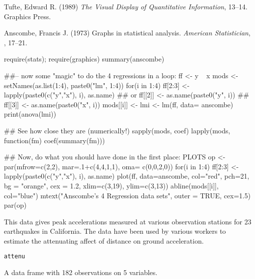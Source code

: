 %
\begin{Source}\relax
Tufte, Edward R. (1989)
\emph{The Visual Display of Quantitative Information}, 13--14.
Graphics Press.
\end{Source}
%
\begin{References}\relax
Anscombe, Francis J. (1973)  Graphs in statistical analysis.
\emph{American Statistician}, , 17--21.
\end{References}
%
\begin{Examples}
\begin{ExampleCode}
require(stats); require(graphics)
summary(anscombe)

##-- now some "magic" to do the 4 regressions in a loop:
ff <- y ~ x
mods <- setNames(as.list(1:4), paste0("lm", 1:4))
for(i in 1:4) {
  ff[2:3] <- lapply(paste0(c("y","x"), i), as.name)
  ## or   ff[[2]] <- as.name(paste0("y", i))
  ##      ff[[3]] <- as.name(paste0("x", i))
  mods[[i]] <- lmi <- lm(ff, data= anscombe)
  print(anova(lmi))
}

## See how close they are (numerically!)
sapply(mods, coef)
lapply(mods, function(fm) coef(summary(fm)))

## Now, do what you should have done in the first place: PLOTS
op <- par(mfrow=c(2,2), mar=.1+c(4,4,1,1), oma= c(0,0,2,0))
for(i in 1:4) {
  ff[2:3] <- lapply(paste0(c("y","x"), i), as.name)
  plot(ff, data=anscombe, col="red", pch=21, bg = "orange", cex = 1.2,
       xlim=c(3,19), ylim=c(3,13))
  abline(mods[[i]], col="blue")
}
mtext("Anscombe's 4 Regression data sets", outer = TRUE, cex=1.5)
par(op)
\end{ExampleCode}
\end{Examples}
%
\begin{Description}\relax
This data gives peak accelerations measured at various observation
stations for 23 earthquakes in California.  The data have been used
by various workers to estimate the attenuating affect of distance
on ground acceleration.
\end{Description}
%
\begin{Usage}
\begin{verbatim}
attenu
\end{verbatim}
\end{Usage}
%
\begin{Format}
A data frame with 182 observations on 5 variables.

\end{Format}
